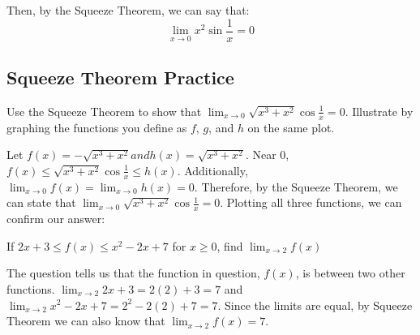 Then, by the Squeeze Theorem, we can say that: $$\lim_{x \to 0}x^2\sin{\frac{1}{x}}=0$$

\subsection{Squeeze Theorem Practice}

\begin{Exercise}
[title=Squeeze Theorem 1, label=squeeze1]
    Use the Squeeze Theorem to show that $\lim_{x \to 0}\sqrt{x^3 + x^2}\cos{\frac{1}{x}} = 0$. Illustrate by graphing the functions you define as $f$, $g$, and $h$ on the same plot.
\end{Exercise}
\begin{Answer}
    [ref=squeeze1]
    Let $f(x) = -\sqrt{x^3+x^2} and h(x) = \sqrt{x^3+x^2}$. Near $0$, $f(x) \leq \sqrt{x^3 + x^2}\cos{\frac{1}{x}} \leq h(x)$. Additionally, $\lim_{x \to 0}f(x) = \lim_{x \to 0}h(x) = 0$. Therefore, by the Squeeze Theorem, we can state that $\lim_{x \to 0}\sqrt{x^3 + x^2}\cos{\frac{1}{x}} = 0$. Plotting all three functions, we can confirm our answer:

\end{Answer}

\begin{Exercise}
    [title=Squeeze Theorem 2, label=squeeze2]
    If $2x+3 \leq f(x) \leq x^2-2x+7$ for $x \geq 0$, find $\lim_{x \to 2}f(x)$
\end{Exercise}
\begin{Answer}
    [ref=squeeze2]
    The question tells us that the function in question, $f(x)$, is between two other functions. $\lim_{x \to 2}2x+3 = 2(2)+3 = 7$ and $\lim_{x \to 2}x^2-2x+7 = 2^2-2(2)+7=7$. Since the limits are equal, by Squeeze Theorem we can also know that $\lim_{x \to 2}f(x) = 7$.
\end{Answer}

